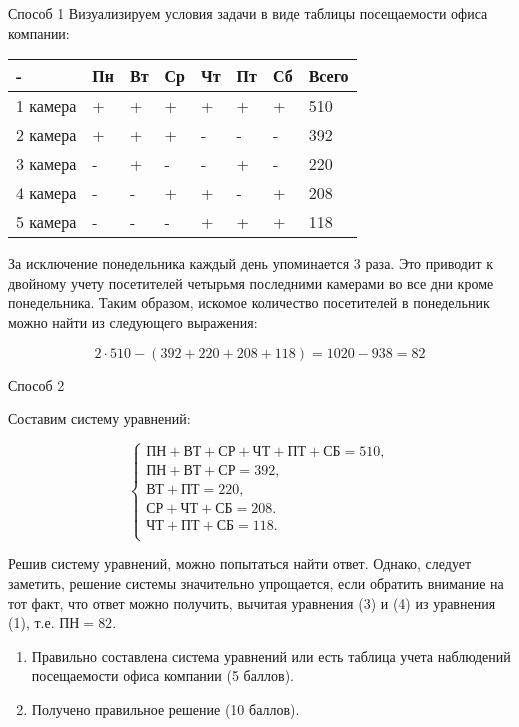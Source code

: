 \solutionSection
Способ 1
Визуализируем условия задачи в виде таблицы посещаемости офиса компании:

\begin{tabular}{ | l | l | l | l | l | l | l | l |}
\hline
  -      & Пн & Вт & Ср & Чт & Пт & Сб & Всего \\ \hline
1 камера & + & + & + & + & + & + & 510 \\
2 камера & + & + & + & - & - & - & 392 \\
3 камера & - & + & - & - & + & - & 220 \\
4 камера & - & - & + & + & - & + & 208 \\
5 камера & - & - & - & + & + & + & 118 \\
\hline
\end{tabular}

За исключение понедельника каждый день упоминается 3 раза. Это приводит к двойному учету посетителей четырьмя последними камерами во все дни кроме понедельника. Таким образом, искомое количество посетителей в понедельник можно найти из следующего выражения:

\begin{displaymath}
2 \cdot 510-(392+220+208+118)=1020-938=82
\end{displaymath}

Способ 2

Составим систему уравнений:

\begin{equation*}
   \begin{cases}
    \text{ПН}+\text{ВТ}+\text{СР}+\text{ЧТ}+\text{ПТ}+\text{СБ}=510,\\
    \text{ПН}+\text{ВТ}+\text{СР} =392, \\
    \text{ВТ}+ \text{ПТ}=220, \\
    \text{СР}+\text{ЧТ}+ \text{СБ}=208. \\
    \text{ЧТ}+\text{ПТ}+\text{СБ}=118. \\ 
   \end{cases}
  \end{equation*}

Решив систему уравнений, можно попытаться найти ответ. Однако, следует заметить, решение системы значительно упрощается, если обратить внимание на тот факт, что ответ можно получить, вычитая уравнения (3) и (4) из уравнения (1), т.е. $\text{ПН} = 82$.


\markSection

\begin{enumerate}
  \item Правильно составлена система уравнений или есть таблица учета наблюдений посещаемости офиса компании (5 баллов). 
  \item Получено правильное решение (10 баллов).
\end{enumerate}